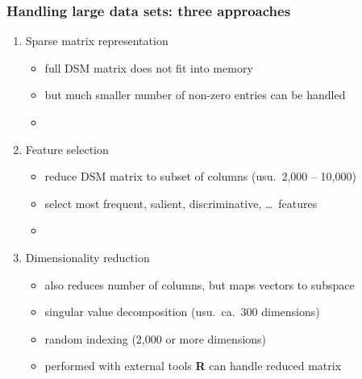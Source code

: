 \begin{frame}
  \frametitle{Handling large data sets: three approaches}

  \begin{enumerate}
  \item Sparse matrix representation
    \begin{itemize}
    \item full DSM matrix does not fit into memory
    \item but much smaller number of non-zero entries can be handled
    \item[] \pause
    \end{itemize}
  \item Feature selection
    \begin{itemize}
    \item reduce DSM matrix to subset of columns (usu.\ 2,000 -- 10,000)
    \item select most frequent, salient, discriminative, \ldots\ features
    \item[] \pause
    \end{itemize}
  \item Dimensionality reduction
    \begin{itemize}
    \item also reduces number of columns, but maps vectors to subspace
    \item singular value decomposition (usu.\ ca.\ 300 dimensions)
    \item random indexing (2,000 or more dimensions)
    \item performed with external tools \so \textbf{R} can handle reduced matrix
    \end{itemize}
  \end{enumerate}
\end{frame}

